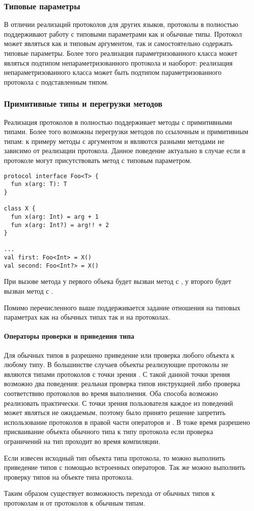 \subsubsection{Типовые параметры}
В отличии реализаций протоколов для других  языков, протоколы в  полностью поддерживают работу с типовыми параметрами как и обычные типы. Протокол может являться как и типовым аргументом, так и самостоятельно содержать типовые параметры. Более того реализация параметризованного класса может являться подтипом непараметризованного протокола и наоборот: реализация непараметризованного класса может быть подтипом параметризованного протокола с подставленным типом.

\subsubsection{Примитивные типы и перегрузки методов}
Реализация протоколов в  полностью поддерживает методы с примитивными типами. Более того возможны перегрузки методов по ссылочным и примитивным типам: к примеру методы с аргументом  и  являются разными методами не зависимо от реализации протокола. Данное поведение актуально в случае если в протоколе могут присутствовать метод с типовым параметром.
\begin{verbatim}
protocol interface Foo<T> {
  fun x(arg: T): T
}

class X {
  fun x(arg: Int) = arg + 1
  fun x(arg: Int?) = arg!! + 2
}

...
val first: Foo<Int> = X()
val second: Foo<Int?> = X()
\end{verbatim}
При вызове метода у первого объека будет вызван метод с , у второго будет вызван метод с .

Помимо перечисленного выше поддерживается задание отношения на типовых параметрах как на обычных типах так и на протоколах.

\paragraph{Операторы проверки и приведения типа}
Для обычных типов в  разрешено приведение или проверка любого объекта к любому типу. В большинстве случаев объекты реализующие протоколы не являются типами протоколов с точки зрения . С такой данной точки зрения возможно два поведения: реальная проверка типов инструкцией  либо проверка соответствию протоколов во время выполнения. Оба способа возможно реализовать практически. С точки зрения пользователя каждое из поведений может являться не ожидаемым, поэтому было принято решение запретить использование протоколов в правой части операторов  и . В тоже время разрешено присваивание объекта обычного типа к типу протокола если проверка ограничений на тип проходит во время компиляции.

Если извесен исходный тип объекта типа протокола, то можно выполнить приведение типов с помощью встроенных операторов. Так же можно выполнить проверку типов на объекте типа протокола.

Таким образом существует возможность перехода от обычных типов к протоколам и от протоколов к обычным типам.
